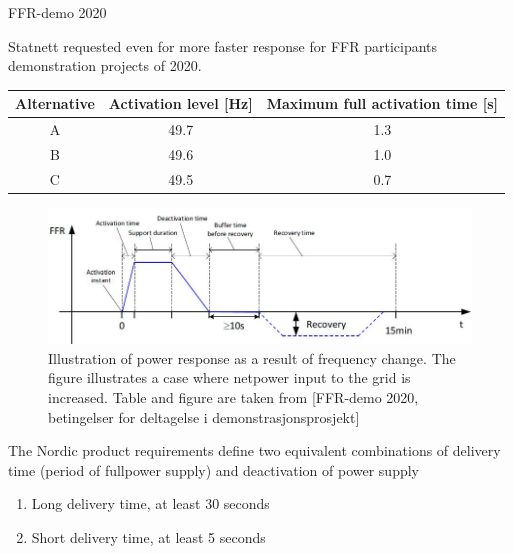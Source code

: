 \documentclass{beamer}
\begin{document}
\begin{frame}{FFR-demo 2020}
\vskip -0.4cm
\begin{block}{}{\tiny
Statnett requested even for more faster response for FFR participants demonstration projects of 2020.}
\end{block}
\vskip -0.2cm
{\tiny
\begin{center}
\begin{tabular}{ c c  c } 
\hline
\rowcolor{Gray} Alternative& Activation level [Hz]&Maximum full activation time [s] \\
\hline
\hline
A& 49.7&1.3\\
\hline
\rowcolor{Gray} B&49.6&1.0\\
\hline
C&49.5&0.7\\
\hline
\end{tabular}
\end{center}}
\vskip -0.2cm
\begin{figure}
\includegraphics[scale=0.4]{Figures/FFRIGJustification Report.jpg}
\caption{\tiny Illustration of power response as a result of frequency change. The figure illustrates a case where netpower input to the grid is increased. Table and figure are taken from [FFR-demo 2020, betingelser for deltagelse i demonstrasjonsprosjekt]}
\end{figure}\vskip -0.8cm
\begin{alertblock}{} {\tiny
The Nordic product requirements define two equivalent combinations of delivery time (period of fullpower supply) and deactivation of power supply
\begin{enumerate}[I]
\item Long delivery time, at least 30 seconds
\item Short delivery time, at least 5 seconds
\end{enumerate}}
\end{alertblock}


\end{frame}
\end{document}
